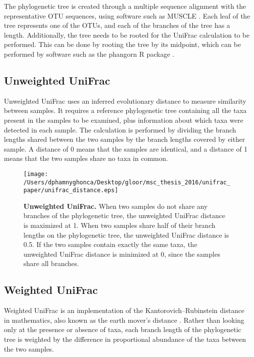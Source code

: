\documentclass[10pt,letterpaper]{article}
\begin{document}
The phylogenetic tree is created through a multiple sequence alignment with the representative OTU sequences, using software such as MUSCLE \cite{edgar2004muscle}. Each leaf of the tree represents one of the OTUs, and each of the branches of the tree has a length. Additionally, the tree needs to be rooted for the UniFrac calculation to be performed. This can be done by rooting the tree by its midpoint, which can be performed by software such as the phangorn R package \cite{schliep2011phangorn}.

\subsection{Unweighted UniFrac}
Unweighted UniFrac \cite{lozupone2005unifrac} uses an inferred evolutionary distance to measure similarity between samples. It requires a reference phylogenetic tree containing all the taxa present in the samples to be examined, plus information about which taxa were detected in each sample. The calculation is performed by dividing the branch lengths shared between the two samples by the branch lengths covered by either sample. A distance of 0 means that the samples are identical, and a distance of 1 means that the two samples share no taxa in common.

\begin{figure}[h]
\texttt{[image: /Users/dphamnyghonca/Desktop/gloor/msc\_thesis\_2016/unifrac\_paper/unifrac\_distance.eps]}
\caption{{\bf Unweighted UniFrac.}
When two samples do not share any branches of the phylogenetic tree, the unweighted UniFrac distance is maximized at 1. When two samples share half of their branch lengths on the phylogenetic tree, the unweighted UniFrac distance is 0.5. If the two samples contain exactly the same taxa, the unweighted UniFrac distance is minimized at 0, since the samples share all branches.}
\label{fig1}
\end{figure}

\subsection{Weighted UniFrac}
Weighted UniFrac \cite{lozupone2007quantitative} is an implementation of the Kantorovich–Rubinstein distance in mathematics, also known as the earth mover’s distance \cite{evans2012phylogenetic}. Rather than looking only at the presence or absence of taxa, each branch length of the phylogenetic tree is weighted by the difference in proportional abundance of the taxa between the two samples.
\end{document}
